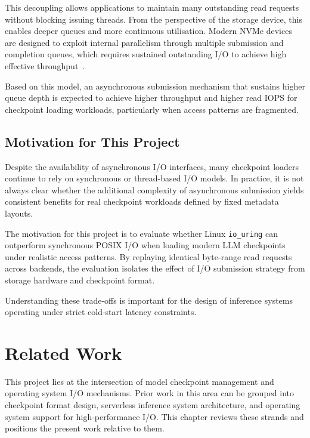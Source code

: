 \documentclass[]{final_report}
\begin{document}
This decoupling allows applications to maintain many outstanding read requests without blocking issuing threads. From the perspective of the storage device, this enables deeper queues and more continuous utilisation. Modern NVMe devices are designed to exploit internal parallelism through multiple submission and completion queues, which requires sustained outstanding I/O to achieve high effective throughput~\cite{NVME_SPEC,STORAGE_QUEUEING}.

Based on this model, an asynchronous submission mechanism that sustains higher queue depth is expected to achieve higher throughput and higher read IOPS for checkpoint loading workloads, particularly when access patterns are fragmented.

\section{Motivation for This Project}

Despite the availability of asynchronous I/O interfaces, many checkpoint loaders continue to rely on synchronous or thread-based I/O models. In practice, it is not always clear whether the additional complexity of asynchronous submission yields consistent benefits for real checkpoint workloads defined by fixed metadata layouts.

The motivation for this project is to evaluate whether Linux \texttt{io\_uring} can outperform synchronous POSIX I/O when loading modern LLM checkpoints under realistic access patterns. By replaying identical byte-range read requests across backends, the evaluation isolates the effect of I/O submission strategy from storage hardware and checkpoint format.

Understanding these trade-offs is important for the design of inference systems operating under strict cold-start latency constraints.




\chapter{Related Work}
\label{chap:related}

This project lies at the intersection of model checkpoint management and operating system I/O mechanisms. Prior work in this area can be grouped into checkpoint format design, serverless inference system architecture, and operating system support for high-performance I/O. This chapter reviews these strands and positions the present work relative to them.
\end{document}
